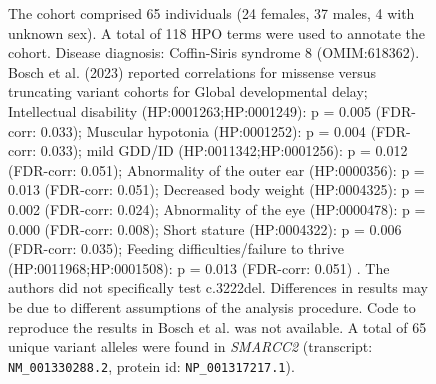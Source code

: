 \begin{figure}[htbp]
\caption{The cohort comprised 65 individuals (24 females, 37 males, 4 with unknown sex). A total of 118 HPO terms were used to annotate the cohort. 
Disease diagnosis: Coffin-Siris syndrome 8 (OMIM:618362). Bosch et al. (2023) reported correlations for  missense versus truncating variant cohorts for 
Global developmental delay; Intellectual disability (HP:0001263;HP:0001249): p = 0.005 (FDR-corr: 0.033); Muscular hypotonia (HP:0001252): p = 0.004 (FDR-corr: 0.033);
mild GDD/ID (HP:0011342;HP:0001256): p = 0.012 (FDR-corr: 0.051); Abnormality of the outer ear (HP:0000356): p = 0.013 (FDR-corr: 0.051); 
Decreased body weight (HP:0004325): p = 0.002 (FDR-corr: 0.024); Abnormality of the eye (HP:0000478): p = 0.000 (FDR-corr: 0.008);
Short stature (HP:0004322): p = 0.006 (FDR-corr: 0.035); Feeding difficulties/failure to thrive (HP:0011968;HP:0001508): p = 0.013 (FDR-corr: 0.051) \cite{PMID_37551667}. 
The authors did not specifically test c.3222del. Differences in results may be due to different assumptions of the analysis procedure. Code to reproduce the results in 
Bosch et al. was not available. A total of 65 unique variant alleles were found in \textit{SMARCC2} (transcript: \texttt{NM\_001330288.2}, protein id: \texttt{NP\_001317217.1}).}
\end{figure}
